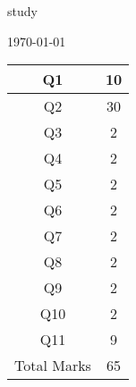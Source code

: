 \documentclass[10pt]{article}
\begin{document}
\sloppy
\vspace*{2cm}
\begin{center}
\huge{study}\\
\vspace*{2cm}
\date[\today
\vspace*{2 cm}
\begin{tabular}{|c|c|}
\hline Q1 & 10 \\ \hline Q2 & 30 \\ \hline Q3 & 2 \\ \hline Q4 & 2 \\ \hline Q5 & 2 \\ \hline Q6 & 2 \\ \hline Q7 & 2 \\ \hline Q8 & 2 \\ \hline Q9 & 2 \\ \hline Q10 & 2 \\ \hline Q11 & 9 \\ \hline Total Marks & 65\\
\hline \end{tabular}\end{center}
\end{document}
